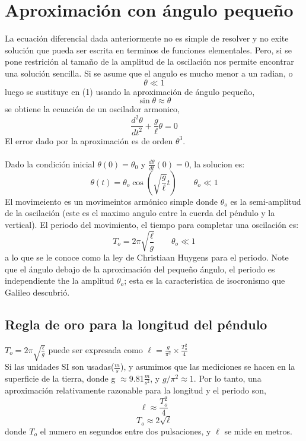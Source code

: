 \documentclass[12pt]{article}
\begin{document}
\pagebreak
\section{Aproximación con ángulo pequeño}
La ecuación diferencial dada anteriormente no es simple de resolver y no exite solución que pueda ser escrita en terminos de funciones elementales. Pero, si se pone restrición al tamaño de la amplitud de la oscilación nos permite encontrar una solución sencilla. Si se asume que el angulo es mucho menor a un radian, o 
{$$\theta \ll 1$$}
luego se sustituye en (1) usando la aproximación de ángulo pequeño,
{ $$\sin \theta \approx \theta $$}
se obtiene la ecuación de un oscilador armonico,
{ $$\frac{d^2\theta}{dt^2}+\frac{g}{\ell}\theta=0$$}
 El error dado por la aproximación es de orden $\theta^3$.\\
 \\
 Dado la condición inicial $\theta(0)= \theta_0$ y $\frac{d\theta}{dt}(0)=0$, la solucion es:
{ $$\theta(t)= \theta_o \cos \left(\sqrt{\frac{g}{\ell}}t \right) \qquad  \theta_o \ll 1  $$}
El movimeiento es un movimeintos armónico simple donde $\theta_o$ es la semi-amplitud de la oscilación (este es el maximo angulo entre la cuerda del péndulo y la vertical). El periodo del movimiento, el tiempo para completar una oscilación es: 
{$$ T_o=2\pi\sqrt{\frac{\ell}{g}} \qquad  \theta_o \ll 1$$}
a lo que se le conoce como la ley de Christiaan Huygens para el periodo. Note que el ángulo debajo de la aproximación del pequeño ángulo, el periodo es independiente the la amplitud $\theta_o$; esta es la caracteristica de isocronismo que Galileo descubrió.

\subsection{Regla de oro para la longitud del péndulo}
{\large $ T_o=2\pi\sqrt{\frac{\ell}{g}}$} puede ser expresada como {\large$\ell=\frac{g}{\pi^2}\times \frac{T_o^2}{4}$}\\
Si las unidades SI son usadas($\frac{m}{s}$), y asumimos que las mediciones se hacen en la superficie de la tierra, donde {g $\approx$9.81$\frac{m}{s^2}$}, y $g/\pi^2 \approx 1$.
Por lo tanto, una aproximación relativamente razonable para la longitud y el periodo son,
$$\ell\approx\frac{T_o^2}{4}$$
$$T_o\approx2\sqrt{\ell}$$
donde $T_o$ el numero en segundos entre dos pulsaciones, y $\ell$ se mide en metros.
\end{document}
